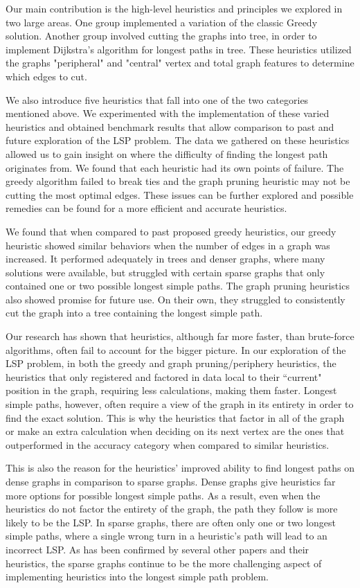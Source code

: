 \documentclass[twocolumn,showpacs,%
  nofootinbib,aps,superscriptaddress,%
  eqsecnum,prd,notitlepage,showkeys,11pt]{article}
\begin{document}
Our main contribution is the high-level heuristics and principles we explored in two large areas. One group implemented a variation of the classic Greedy solution. Another group involved cutting the graphs into tree, in order to implement Dijkstra's algorithm for longest paths in tree. These heuristics utilized the graphs "peripheral" and "central" vertex and total graph features to determine which edges to cut.

We also introduce five heuristics that fall into one of the two categories mentioned above. We experimented with the implementation of these varied heuristics and obtained benchmark results that allow comparison to past and future exploration of the LSP problem. The data we gathered on these heuristics allowed us to gain insight on where the difficulty of finding the longest path originates from. We found that each heuristic had its own points of failure. The greedy algorithm failed to break ties and the graph pruning heuristic may not be cutting the most optimal edges. These issues can be further explored and possible remedies can be found for a more efficient and accurate heuristics. 

We found that when compared to past proposed greedy heuristics, our greedy heuristic showed similar behaviors when the number of edges in a graph was increased. It performed adequately in trees and denser graphs, where many solutions were available, but struggled with certain sparse graphs that only contained one or two possible longest simple paths. The graph pruning heuristics also showed promise for future use. On their own, they struggled to consistently cut the graph into a tree containing the longest simple path. 

Our research has shown that heuristics, although far more faster, than brute-force algorithms, often fail to account for the bigger picture. In our exploration of the LSP problem, in both the greedy and graph pruning/periphery heuristics, the heuristics that only registered and factored in data local to their ``current" position in the graph, requiring less calculations, making them faster. Longest simple paths, however, often require a view of the graph in its entirety in order to find the exact solution. This is why the heuristics that factor in all of the graph or make an extra calculation when deciding on its next vertex are the ones that outperformed in the accuracy category when compared to similar heuristics.

This is also the reason for the heuristics' improved ability to find longest paths on dense graphs in comparison to sparse graphs. Dense graphs give heuristics far more options for possible longest simple paths. As a result, even when the heuristics do not factor the entirety of the graph, the path they follow is more likely to be the LSP. In sparse graphs, there are often only one or two longest simple paths, where a single wrong turn in a heuristic's path will lead to an incorrect LSP. As has been confirmed by several other papers and their heuristics, the sparse graphs continue to be the more challenging aspect of implementing heuristics into the longest simple path problem.
\end{document}
